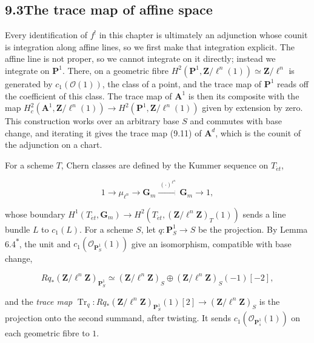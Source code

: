\documentclass[11pt]{article}
\newcommand{\bpout}[1]{#1\textsuperscript{\hyperlink{bp-outside}{\ensuremath{\ast}}}}
\begin{document}
\subsection*{\texorpdfstring{9.3\quad The trace map of affine space}{9.3 The trace map of affine space}}
\label{bp17}%
\label{bp18}%
Every identification of \(f^!\) in this chapter is ultimately an adjunction whose counit is integration along affine lines, so we first make that integration explicit. The affine line is not proper, so we cannot integrate on it directly; instead we integrate on \(\mathbf P^1\). There, on a geometric fibre \(H^2(\mathbf P^1,\mathbf Z/\ell^n(1))\simeq\mathbf Z/\ell^n\) is generated by \(c_1(\mathcal O(1))\), the class of a point, and the trace map of \(\mathbf P^1\) reads off the coefficient of this class. The trace map of \(\mathbf A^1\) is then its composite with the map \(H^2_c(\mathbf A^1,\mathbf Z/\ell^n(1))\to H^2(\mathbf P^1,\mathbf Z/\ell^n(1))\) given by extension by zero. This construction works over an arbitrary base \(S\) and commutes with base change, and iterating it gives the trace map (9.11) of \(\mathbf A^d\), which is the counit of the adjunction on a chart.

For a scheme \(T\), Chern classes are defined by the Kummer sequence on \(T_{\acute{e}t}\),

\[
1\longrightarrow\mu_{\ell^n}\longrightarrow\mathbf G_m
\xrightarrow{\ (\cdot)^{\ell^n}\ }\mathbf G_m
\longrightarrow1,
\tag{9.7}
\]

whose boundary \(H^1(T_{\acute{e}t},\mathbf G_m)\to
H^2(T_{\acute{e}t},(\mathbf Z/\ell^n\mathbf Z)_T(1))\) sends a line bundle \(L\) to \(c_1(L)\). For a scheme \(S\), let \(q:\mathbf P^1_S\to S\) be the projection. By Lemma \bpout{6.4}, the unit and \(c_1(\mathcal O_{\mathbf P^1_S}(1))\) give an isomorphism, compatible with base change,

\[
Rq_*(\mathbf Z/\ell^n\mathbf Z)_{\mathbf P^1_S}
\simeq(\mathbf Z/\ell^n\mathbf Z)_{S}\oplus(\mathbf Z/\ell^n\mathbf Z)_{S}(-1)[-2],
\tag{9.8}
\]

and the \emph{trace map} \(\operatorname{Tr}_q:Rq_*(\mathbf Z/\ell^n\mathbf Z)_{\mathbf P^1_S}(1)[2]
\to(\mathbf Z/\ell^n\mathbf Z)_{S}\) is the projection onto the second summand, after twisting. It sends \(c_1(\mathcal O_{\mathbf P^1_{\bar s}}(1))\) on each geometric fibre to \(1\).
\end{document}
